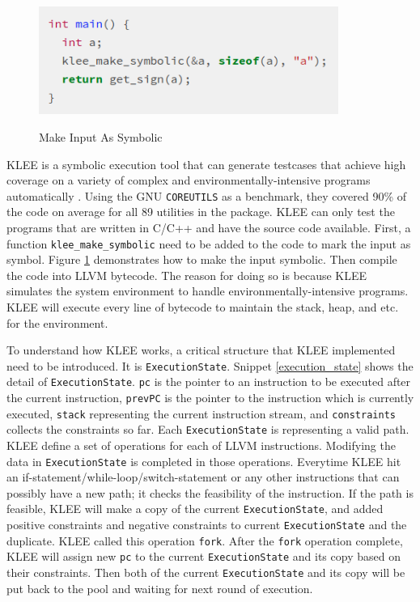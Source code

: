 \begin{figure}[h]
\begin{center}
{\mbox{\includegraphics[height=100pt]{figures/make_symbolic.png}}}    
\end{center}
\caption{\label{make_symbolic}Make Input As Symbolic}
\end{figure}

KLEE is a symbolic execution tool that can generate testcases that achieve high coverage on a variety of complex and environmentally-intensive programs automatically \cite{Cadar:2008:KUA:1855741.1855756}. Using the GNU \texttt{COREUTILS} as a benchmark, they covered 90\% of the code on average for all 89 utilities in the package. KLEE can only test the programs that are written in C/C++ and have the source code available. First, a function \texttt{klee\_make\_symbolic} need to be added to the code to mark the input as symbol. Figure \ref{make_symbolic} demonstrates how to make the input symbolic. Then compile the code into LLVM bytecode. The reason for doing so is because KLEE simulates the system environment to handle environmentally-intensive programs. KLEE will execute every line of bytecode to maintain the stack, heap, and etc. for the environment. 

To understand how KLEE works, a critical structure that KLEE implemented need to be introduced. It is \texttt{ExecutionState}. Snippet \ref{execution_state} shows the detail of \texttt{ExecutionState}. \texttt{pc} is the pointer to an instruction to be executed after the current instruction, \texttt{prevPC} is the pointer to the instruction which is currently executed, \texttt{stack} representing the current instruction stream, and \texttt{constraints} collects the constraints so far. Each \texttt{ExecutionState} is representing a valid path. KLEE define a set of operations for each of LLVM instructions. Modifying the data in \texttt{ExecutionState} is completed in those operations. Everytime KLEE hit an if-statement/while-loop/switch-statement or any other instructions that can possibly have a new path; it checks the feasibility of the instruction. If the path is feasible, KLEE will make a copy of the current \texttt{ExecutionState}, and added positive constraints and negative constraints to current \texttt{ExecutionState} and the duplicate. KLEE called this operation \texttt{fork}. After the \texttt{fork} operation complete, KLEE will assign new \texttt{pc} to the current \texttt{ExecutionState} and its copy based on their constraints. Then both of the current \texttt{ExecutionState} and its copy will be put back to the pool and waiting for next round of execution.

